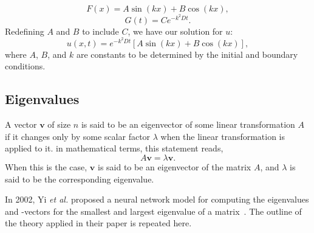 \documentclass[a4paper, 
amsfonts, 
amssymb, 
amsmath, 
reprint, 
showkeys, 
nofootinbib, 
twoside]{revtex4-2}
\begin{document}
\begin{equation}
    F(x) = A \sin(kx) + B \cos(kx),
\end{equation}
\begin{equation}
    G(t) = Ce^{-k^2Dt}.
\end{equation}
Redefining $A$ and $B$ to include $C$, we have our solution for $u$:
\begin{equation}
    u(x, t) =  e^{-k^2Dt} \left[ A \sin(kx) + B \cos(kx) \right],
    \label{eq:diff_an}
\end{equation}
where $A$, $B$, and $k$ are constants to be determined by the initial and boundary conditions. 

\subsection{Eigenvalues}

A vector $\mathbf{v}$ of size $n$ is said to be an eigenvector of some linear transformation $A$ if it changes only by some scalar factor $\lambda$ when the linear transformation is applied to it. in mathematical terms, this statement reads, 
\begin{equation}
    A \mathbf{v} = \lambda \mathbf{v}.
    \label{eq:eigval}
\end{equation}
When this is the case, $\mathbf{v}$ is said to be an eigenvector of the matrix $A$, and $\lambda$ is said to be the corresponding eigenvalue.

In 2002, Yi \textit{et al.} proposed a neural network model for computing the eigenvalues and -vectors for the smallest and largest eigenvalue of a matrix~\cite{YI20041155}. The outline of the theory applied in their paper is repeated here.
\end{document}
